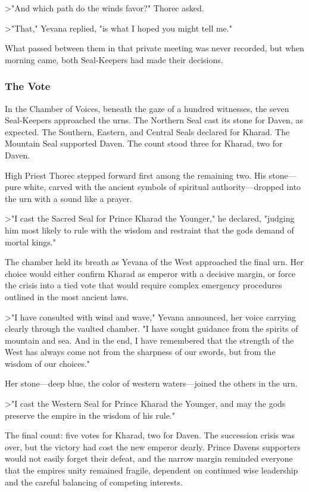 \textgreater"And which path do the winds favor?" Thorec asked.

\textgreater"That," Yevana replied, "is what I hoped you might tell me."

What passed between them in that private meeting was never recorded, but
when morning came, both Seal-Keepers had made their decisions.

\subsubsection{The Vote}\label{the-vote}

In the Chamber of Voices, beneath the gaze of a hundred witnesses, the
seven Seal-Keepers approached the urns. The Northern Seal cast its stone
for Daven, as expected. The Southern, Eastern, and Central Seals
declared for Kharad. The Mountain Seal supported Daven. The count stood
three for Kharad, two for Daven.

High Priest Thorec stepped forward first among the remaining two. His
stone---pure white, carved with the ancient symbols of spiritual
authority---dropped into the urn with a sound like a prayer.

\textgreater"I cast the Sacred Seal for Prince Kharad the Younger," he
declared, "judging him most likely to rule with the wisdom and restraint
that the gods demand of mortal kings."

The chamber held its breath as Yevana of the West approached the final
urn. Her choice would either confirm Kharad as emperor with a decisive
margin, or force the crisis into a tied vote that would require complex
emergency procedures outlined in the most ancient laws.

\textgreater"I have consulted with wind and wave," Yevana announced, her
voice carrying clearly through the vaulted chamber. "I have sought
guidance from the spirits of mountain and sea. And in the end, I have
remembered that the strength of the West has always come not from the
sharpness of our swords, but from the wisdom of our choices."

Her stone---deep blue, the color of western waters---joined the others
in the urn.

\textgreater"I cast the Western Seal for Prince Kharad the Younger, and
may the gods preserve the empire in the wisdom of his rule."

The final count: five votes for Kharad, two for Daven. The succession
crisis was over, but the victory had cost the new emperor dearly. Prince
Daven\textquotesingle s supporters would not easily forget their defeat,
and the narrow margin reminded everyone that the
empire\textquotesingle s unity remained fragile, dependent on continued
wise leadership and the careful balancing of competing interests.


